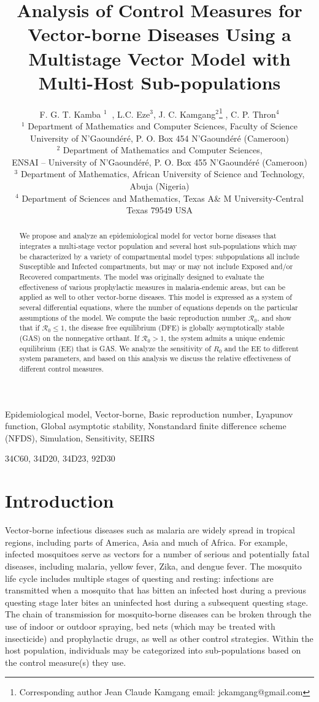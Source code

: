 \documentclass[a4paper]{article}
\title{Analysis of Control Measures for Vector-borne Diseases Using a  Multistage Vector Model with Multi-Host Sub-populations}
\author{F. G. T. Kamba
$^{1}~$ , L.C. Eze$^{3}$,  J. C. Kamgang$^{2}$\thanks{Corresponding author Jean Claude Kamgang email: jckamgang@gmail.com} , C. P. Thron$^{4}$ 
\\$^1$ Department of Mathematics and Computer Sciences, Faculty of Science\\ University of N'Gaound\'er\'e, P. O. Box 454 N'Gaound\'er\'e (Cameroon)
\\$^2$ Department of Mathematics and Computer Sciences,\\ ENSAI -- University of N'Gaound\'er\'e, P. O. Box 455 N'Gaound\'er\'e (Cameroon)\\
$^3$ Department of Mathematics, African University of Science and Technology, Abuja (Nigeria)\\
$^4$ Department of Sciences and Mathematics, Texas A\& M University-Central Texas 79549 USA}
\begin{document}
\maketitle
    
\begin{abstract}
We propose and analyze  an epidemiological model for vector borne diseases that integrates a multi-stage vector population and several host sub-populations which may be characterized by a variety of compartmental model types: subpopulations all include Susceptible and Infected compartments, but may or may not include Exposed and/or Recovered compartments. The model was originally designed  to evaluate the effectiveness of various prophylactic measures in malaria-endemic areas, but can be applied as well to other vector-borne diseases. This model is expressed as a system of several differential equations, where the number of equations depends on the particular assumptions of the model.  We compute the basic reproduction number $\mathcal R_0$, 
and show  that if $\mathcal R_0\leqslant 1$, the disease free equilibrium (DFE)  is globally asymptotically stable (GAS) on the nonnegative orthant.  
If $\mathcal R_0>1$,  the system admits a unique endemic equilibrium (EE) that is GAS. We analyze the sensitivity of $R_0$ and the EE to different system parameters, and based on this analysis  we discuss the relative effectiveness  of different control measures.  
\end{abstract}

 Epidemiological model, Vector-borne, Basic reproduction number, Lyapunov function, Global asymptotic stability, Nonstandard finite difference scheme (NFDS), Simulation, Sensitivity, SEIRS

  34C60, 34D20, 34D23, 92D30
\section{Introduction}\label{sec.Intro}
 Vector-borne infectious diseases such as malaria are widely spread in tropical regions, including parts of America, Asia and much of Africa. For example, infected mosquitoes serve as vectors for a number of serious and potentially fatal diseases, including malaria, yellow fever, Zika, and dengue fever. The mosquito life cycle includes multiple stages of questing and resting:  infections are transmitted when a mosquito that has bitten an infected host during a previous questing stage later bites an uninfected host during a subsequent questing stage.  The chain of transmission for mosquito-borne diseases can be broken through the use of indoor or outdoor spraying, bed nets (which may be treated with insecticide) and prophylactic drugs, as well as other control strategies. Within the host population, individuals may be categorized into sub-populations based on the control measure(s) they use.
\end{document}
